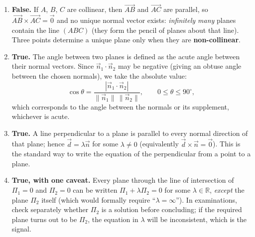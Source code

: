 \documentclass[11pt]{article}
\begin{document}
\begin{corrige}
\begin{enumerate}
\item \textbf{False.} If $A$, $B$, $C$ are collinear, then $\overrightarrow{AB}$ and $\overrightarrow{AC}$ are parallel, so $\overrightarrow{AB}\times\overrightarrow{AC}=\vec{0}$ and no unique normal vector exists: \emph{infinitely many} planes contain the line $(ABC)$ (they form the pencil of planes about that line). Three points determine a unique plane only when they are \textbf{non-collinear}.

\item \textbf{True.} The angle between two planes is defined as the acute angle between their normal vectors. Since $\vec{n}_1\cdot\vec{n}_2$ may be negative (giving an obtuse angle between the chosen normals), we take the absolute value:
\[
\cos\theta=\dfrac{|\vec{n}_1\cdot\vec{n}_2|}{\|\vec{n}_1\|\,\|\vec{n}_2\|},\qquad 0\leq\theta\leq 90^{\circ},
\]
which corresponds to the angle between the normals or its supplement, whichever is acute.

\item \textbf{True.} A line perpendicular to a plane is parallel to every normal direction of that plane; hence $\vec{d}=\lambda\vec{n}$ for some $\lambda\neq 0$ (equivalently $\vec{d}\times\vec{n}=\vec{0}$). This is the standard way to write the equation of the perpendicular from a point to a plane.

\item \textbf{True, with one caveat.} Every plane through the line of intersection of $\Pi_1=0$ and $\Pi_2=0$ can be written $\Pi_1+\lambda\Pi_2=0$ for some $\lambda\in\mathbb{R}$, \emph{except} the plane $\Pi_2$ itself (which would formally require ``$\lambda=\infty$''). In examinations, check separately whether $\Pi_2$ is a solution before concluding; if the required plane turns out to be $\Pi_2$, the equation in $\lambda$ will be inconsistent, which is the signal.
\end{enumerate}
\end{corrige}
\end{document}
